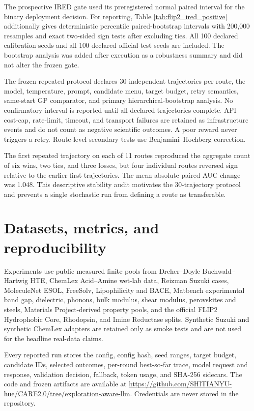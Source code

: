 \documentclass[pdflatex,sn-nature]{sn-jnl}
\begin{document}
\begin{appendices}
The prospective IRED gate used its preregistered normal paired interval for the
binary deployment decision. For reporting, Table
\ref{tab:flip2_ired_positive} additionally gives deterministic percentile
paired-bootstrap intervals with 200,000 resamples and exact two-sided sign
tests after excluding ties. All 100 declared calibration seeds and all 100
declared official-test seeds are included. The bootstrap analysis was added
after execution as a robustness summary and did not alter the frozen gate.

The frozen repeated protocol declares 30 independent trajectories per route,
the model, temperature, prompt, candidate menu, target budget, retry semantics,
same-start GP comparator, and primary hierarchical-bootstrap analysis. No
confirmatory interval is reported until all declared trajectories complete.
API cost-cap, rate-limit, timeout, and transport failures are retained as
infrastructure events and do not count as negative scientific outcomes. A poor
reward never triggers a retry. Route-level secondary tests use
Benjamini--Hochberg correction.

The first repeated trajectory on each of 11 routes reproduced the aggregate
count of six wins, two ties, and three losses, but four individual routes
reversed sign relative to the earlier first trajectories. The mean absolute
paired AUC change was 1.048. This descriptive stability audit motivates the
30-trajectory protocol and prevents a single stochastic run from defining a
route as transferable.

\section{Datasets, metrics, and reproducibility}
\label{sec:repro}

Experiments use public measured finite pools from Dreher--Doyle
Buchwald--Hartwig HTE, ChemLex Acid--Amine wet-lab data, Reizman Suzuki cases,
MoleculeNet ESOL, FreeSolv, Lipophilicity and BACE, Matbench experimental band
gap, dielectric, phonons, bulk modulus, shear modulus, perovskites and steels,
Materials Project-derived property pools, and the official FLIP2 Hydrophobic
Core, Rhodopsin, and Imine Reductase splits. Synthetic Suzuki and synthetic
ChemLex adapters are retained only as smoke tests and are not used for the
headline real-data claims.

Every reported run stores the config, config hash, seed ranges, target budget,
candidate IDs, selected outcomes, per-round best-so-far trace, model request
and response, validation decision, fallback, token usage, and SHA-256 sidecars.
The code and frozen artifacts are available at
\url{https://github.com/SHITIANYU-hue/CARE2.0/tree/exploration-aware-llm}.
Credentials are never stored in the repository.


\end{appendices}
\end{document}
